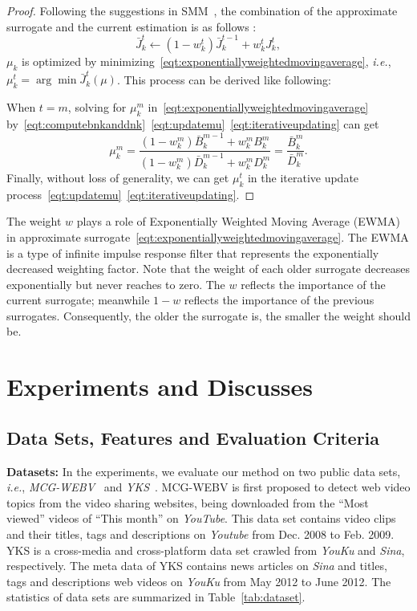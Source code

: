 \documentclass[runningheads]{llncs}
\begin{document}
\begin{proof}
Following the suggestions in SMM~\cite{mairal-2013-SMM}, the combination of the approximate surrogate and the current estimation is as follows :
\begin{equation} \label{eqt:exponentiallyweightedmovingaverage}
    \bar{J}^t_k \leftarrow (1-w^t_k)\bar{J}^{t-1}_k + w^t_k J^t_k,
\end{equation}
$\mu_k$ is optimized by minimizing~\eqref{eqt:exponentiallyweightedmovingaverage}, \emph{i.e.},  $\mu^t_k = \arg \min \bar{J}^t_k(\mu)$. This process can be derived like following:

When $t=m$, solving for $\mu^m_k$ in~\eqref{eqt:exponentiallyweightedmovingaverage} by~\eqref{eqt:computebnkanddnk}~\eqref{eqt:updatemu}~\eqref{eqt:iterativeupdating} can get
\begin{equation}
\mu^m_k = \frac{(1-w^m_k)\bar{B}^{m-1}_k+w^m_kB^m_k}{(1-w^m_k)\bar{D}^{m-1}_k+w^m_kD^m_k} = \frac{\bar{B}^m_k}{\bar{D}^m_k}.
\end{equation}
Finally, without loss of generality, we can get $\mu^t_k$ in the iterative update process~\eqref{eqt:updatemu}~\eqref{eqt:iterativeupdating}.
\end{proof}
The weight $w$ plays a role of Exponentially Weighted Moving Average (EWMA) in approximate surrogate~\eqref{eqt:exponentiallyweightedmovingaverage}. The EWMA is a type
of infinite impulse response filter that represents the exponentially decreased weighting factor. Note that the weight of each older surrogate decreases exponentially but never reaches to zero. The $w$ reflects the importance of the current surrogate; meanwhile $1-w$ reflects the importance of the previous surrogates. Consequently, the older the surrogate is, the smaller the weight should be.
%
%
\section{Experiments and Discusses}
\label{sec:results}
\subsection{Data Sets, Features and Evaluation Criteria}
\textbf{Datasets:} In the experiments, we evaluate our method on two public data sets, \emph{i.e.}, \emph{MCG-WEBV}~\cite{cao-2011-tracking} and \emph{YKS}~\cite{zhang-2013-cross}. MCG-WEBV is first proposed to detect web video topics from the video sharing websites, being downloaded from the ``Most viewed'' videos of ``This month'' on \emph{YouTube}. This data set contains video clips and their titles, tags and descriptions on \emph{Youtube} from Dec. 2008 to Feb. 2009. YKS is a cross-media and cross-platform data set crawled from \emph{YouKu} and \emph{Sina}, respectively. The meta data of YKS contains news articles on \emph{Sina} and titles, tags and descriptions web videos on \emph{YouKu} from May 2012 to June 2012. The statistics of data sets are summarized in Table~\ref{tab:dataset}.
\end{document}
